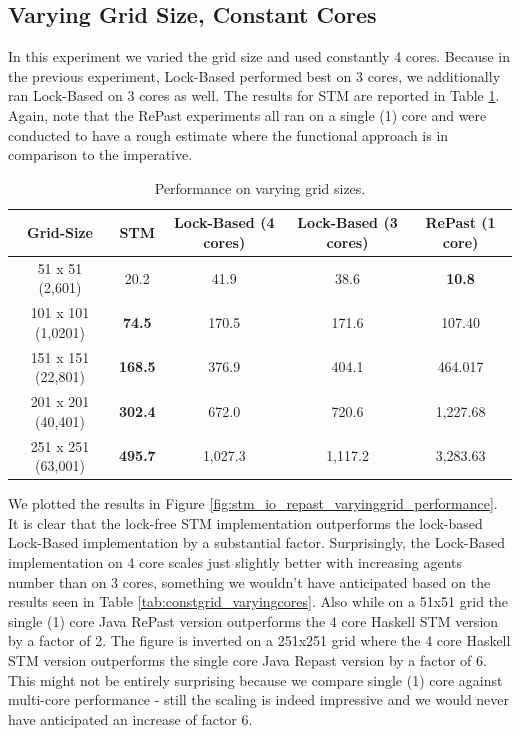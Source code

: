 \subsection{Varying Grid Size, Constant Cores}
In this experiment we varied the grid size and used constantly 4 cores. Because in the previous experiment, Lock-Based performed best on 3 cores, we additionally ran Lock-Based on 3 cores as well. The results for STM are reported in Table \ref{tab:varyinggrid_constcores}. Again, note that the RePast experiments all ran on a single (1) core and were conducted to have a rough estimate where the functional approach is in comparison to the imperative.

\begin{table}
	\centering
  	\begin{tabular}{ c || c | c | c | c }
        Grid-Size          & STM              & Lock-Based (4 cores) & Lock-Based (3 cores) & RePast (1 core) \\ \hline \hline 
   		51 x 51 (2,601)    & 20.2             & 41.9                 & 38.6                 & \textbf{10.8}   \\ \hline
   		101 x 101 (1,0201) & \textbf{74.5}    & 170.5                & 171.6                & 107.40          \\ \hline
   		151 x 151 (22,801) & \textbf{168.5}   & 376.9                & 404.1                & 464.017         \\ \hline
   		201 x 201 (40,401) & \textbf{302.4}   & 672.0                & 720.6                & 1,227.68        \\ \hline
   		251 x 251 (63,001) & \textbf{495.7}   & 1,027.3              & 1,117.2              & 3,283.63
  	\end{tabular}

  	\caption{Performance on varying grid sizes.}
	\label{tab:varyinggrid_constcores}
\end{table}

We plotted the results in Figure \ref{fig:stm_io_repast_varyinggrid_performance}. It is clear that the lock-free STM implementation outperforms the lock-based Lock-Based implementation by a substantial factor. Surprisingly, the Lock-Based implementation on 4 core scales just slightly better with increasing agents number than on 3 cores, something we wouldn't have anticipated based on the results seen in Table \ref{tab:constgrid_varyingcores}. Also  while on a 51x51 grid the single (1) core Java RePast version outperforms the 4 core Haskell STM version by a factor of 2. The figure is inverted on a 251x251 grid where the 4 core Haskell STM version outperforms the single core Java Repast version by a factor of 6. This might not be entirely surprising because we compare single (1) core against multi-core performance - still the scaling is indeed impressive and we would never have anticipated an increase of factor 6.


